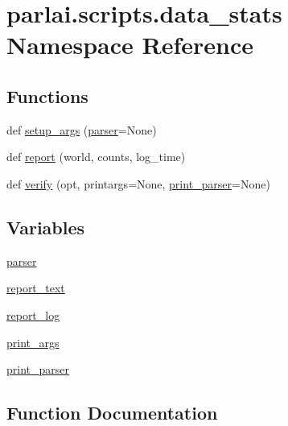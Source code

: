\hypertarget{namespaceparlai_1_1scripts_1_1data__stats}{}\section{parlai.\+scripts.\+data\+\_\+stats Namespace Reference}
\label{namespaceparlai_1_1scripts_1_1data__stats}
\subsection*{Functions}
\begin{DoxyCompactItemize}
\item 
def \hyperlink{namespaceparlai_1_1scripts_1_1data__stats_add47fb96d75895f4c21d9e310cb1df40}{setup\+\_\+args} (\hyperlink{namespaceparlai_1_1scripts_1_1data__stats_aee1c7e7ad83716e519beffc34ff7c8cd}{parser}=None)
\item 
def \hyperlink{namespaceparlai_1_1scripts_1_1data__stats_a8cc2308cc735ce6cf029d4c02fea5a21}{report} (world, counts, log\+\_\+time)
\item 
def \hyperlink{namespaceparlai_1_1scripts_1_1data__stats_a3bf0a490abe0b6ea608d1f9ece194c79}{verify} (opt, printargs=None, \hyperlink{namespaceparlai_1_1scripts_1_1data__stats_a89286b21a94125aadf5cc8571abe3f7f}{print\+\_\+parser}=None)
\end{DoxyCompactItemize}
\subsection*{Variables}
\begin{DoxyCompactItemize}
\item 
\hyperlink{namespaceparlai_1_1scripts_1_1data__stats_aee1c7e7ad83716e519beffc34ff7c8cd}{parser}
\item 
\hyperlink{namespaceparlai_1_1scripts_1_1data__stats_a63e65c276e15211e573af8db9cfb9dbf}{report\+\_\+text}
\item 
\hyperlink{namespaceparlai_1_1scripts_1_1data__stats_a08ce833d7c44ab350dfd93f9ae09b614}{report\+\_\+log}
\item 
\hyperlink{namespaceparlai_1_1scripts_1_1data__stats_a56b1df909ab791a73bd6c2d5d4776531}{print\+\_\+args}
\item 
\hyperlink{namespaceparlai_1_1scripts_1_1data__stats_a89286b21a94125aadf5cc8571abe3f7f}{print\+\_\+parser}
\end{DoxyCompactItemize}


\subsection{Function Documentation}
\mbox{\label{namespaceparlai_1_1scripts_1_1data__stats_a8cc2308cc735ce6cf029d4c02fea5a21}} 
